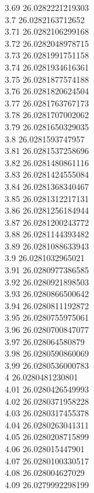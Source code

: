 {3.69	26.0282221219303\\
3.7	26.0282163712652\\
3.71	26.0282106299168\\
3.72	26.0282048978715\\
3.73	26.0281991751158\\
3.74	26.0281934616361\\
3.75	26.0281877574188\\
3.76	26.0281820624504\\
3.77	26.0281763767173\\
3.78	26.0281707002062\\
3.79	26.0281650329035\\
3.8	26.0281593747957\\
3.81	26.0281537258696\\
3.82	26.0281480861116\\
3.83	26.0281424555084\\
3.84	26.0281368340467\\
3.85	26.0281312217131\\
3.86	26.0281256184944\\
3.87	26.0281200243772\\
3.88	26.0281144393482\\
3.89	26.0281088633943\\
3.9	26.0281032965021\\
3.91	26.0280977386585\\
3.92	26.0280921898503\\
3.93	26.0280866500642\\
3.94	26.0280811192872\\
3.95	26.0280755975061\\
3.96	26.0280700847077\\
3.97	26.028064580879\\
3.98	26.0280590860069\\
3.99	26.0280536000783\\
4	26.0280481230801\\
4.01	26.0280426549993\\
4.02	26.0280371958228\\
4.03	26.0280317455378\\
4.04	26.0280263041311\\
4.05	26.0280208715899\\
4.06	26.028015447901\\
4.07	26.0280100330517\\
4.08	26.028004627029\\
4.09	26.0279992298199\\
}

